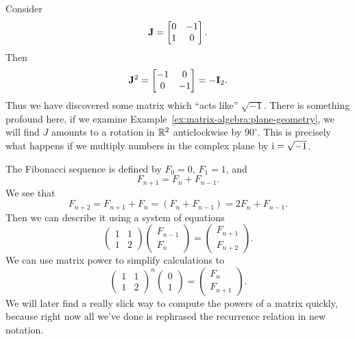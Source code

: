 \begin{example}
  Consider
  \begin{equation}
\mathbf{J} = \begin{bmatrix}0 & -1\\1 & 0
\end{bmatrix}.
  \end{equation}
  Then
  \begin{equation}
    \mathbf{J}^{2} = \begin{bmatrix}-1 & 0\\
      0 & -1
    \end{bmatrix} = -\mathbf{I}_{2}.
  \end{equation}
  Thus we have discovered some matrix which ``acts like'' $\sqrt{-1}$.
There is something profound here, if we examine Example~\ref{ex:matrix-algebra:plane-geometry},
we will find $J$ amounts to a rotation in $\mathbb{R}^{2}$ anticlockwise by
$90^{\circ}$. This is precisely what happens if we multiply numbers in
the complex plane by $\mathrm{i}=\sqrt{-1}$.
\end{example}

\begin{example}
  The Fibonacci sequence is defined by $F_{0}=0$, $F_{1}=1$, and
  \begin{equation}
F_{n+1} = F_{n} + F_{n-1}.
  \end{equation}
  We see that
  \begin{equation}
F_{n+2} = F_{n+1} + F_{n} = (F_{n} + F_{n-1}) = 2F_{n}+F_{n-1}.
  \end{equation}
  Then we can describe it using a system of equations
  \begin{equation}
\begin{pmatrix}
1 & 1\\
1 & 2
\end{pmatrix}
\begin{pmatrix}F_{n-1}\\ F_{n}
\end{pmatrix} = \begin{pmatrix}F_{n+1}\\ F_{n+2}
\end{pmatrix}.
  \end{equation}
  We can use matrix power to simplify calculations to
  \begin{equation}
\begin{pmatrix}
1 & 1\\
1 & 2
\end{pmatrix}^{n}
\begin{pmatrix}0\\1
\end{pmatrix} = \begin{pmatrix}F_{n}\\ F_{n+1}
\end{pmatrix}.
\end{equation}
We will later find a really slick way to compute the powers of a matrix
quickly, because right now all we've done is rephrased the recurrence
relation in new notation.
\end{example}

